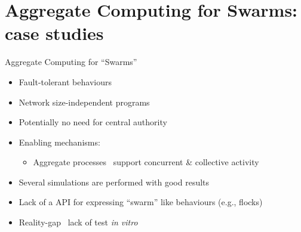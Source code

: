 \documentclass[8pt, aspectratio=169, handout]{beamer}
\begin{document}
\section{Aggregate Computing for Swarms: case studies}

\begin{frame}{Aggregate Computing for ``Swarms''}
  \begin{card}[Benefits]
    \begin{itemize}
      \item Fault-tolerant behaviours
      \item Network size-independent programs
      \item Potentially no need for central authority
      \item Enabling mechanisms:
        \begin{itemize}
          \item Aggregate processes \faArrowRight \, support concurrent \& collective activity
        \end{itemize}
    \end{itemize}
  \end{card}

  \begin{card}
    \begin{itemize}
      \item Several simulations are performed with good results
      \item Lack of a API for expressing ``swarm'' like behaviours (e.g., flocks)
      \item Reality-gap \faArrowRight \, lack of test \emph{in vitro}
    \end{itemize}
  \end{card}

\end{frame}
\end{document}

